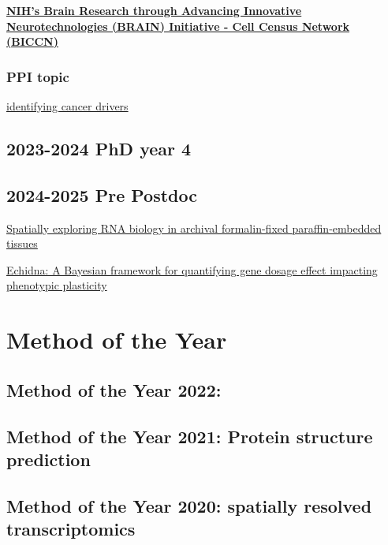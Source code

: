 \documentclass[
]{book}
\begin{document}
\textbf{\href{https://biccn.org/}{NIH's Brain Research through Advancing Innovative Neurotechnologies (BRAIN) Initiative - Cell Census Network (BICCN)}}

\hypertarget{ppi-topic}{%
\subsection{PPI topic}\label{ppi-topic}}

\href{https://mp.weixin.qq.com/s/EWLSD7wB-GUIXS94LtPtWQ}{identifying cancer drivers}

\hypertarget{phd-year-4}{%
\section{2023-2024 PhD year 4}\label{phd-year-4}}

\hypertarget{pre-postdoc}{%
\section{2024-2025 Pre Postdoc}\label{pre-postdoc}}

\href{https://www.cell.com/action/showPdf?pii=S0092-8674\%2824\%2901019-5}{Spatially exploring RNA biology in archival formalin-fixed paraffin-embedded tissues}

\href{https://www.biorxiv.org/content/10.1101/2024.12.15.628568v1}{Echidna: A Bayesian framework for quantifying gene dosage effect impacting phenotypic plasticity}

\hypertarget{method-of-the-year}{%
\chapter{Method of the Year}\label{method-of-the-year}}

\hypertarget{method-of-the-year-2022}{%
\section{Method of the Year 2022:}\label{method-of-the-year-2022}}

\hypertarget{method-of-the-year-2021-protein-structure-prediction}{%
\section{Method of the Year 2021: Protein structure prediction}\label{method-of-the-year-2021-protein-structure-prediction}}

\hypertarget{method-of-the-year-2020-spatially-resolved-transcriptomics}{%
\section{Method of the Year 2020: spatially resolved transcriptomics}\label{method-of-the-year-2020-spatially-resolved-transcriptomics}}
\end{document}
